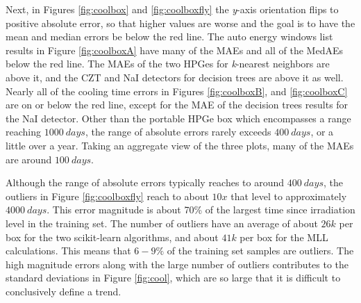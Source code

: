Next, in Figures \ref{fig:coolbox} and \ref{fig:coolboxfly} the \textit{y}-axis
orientation flips to positive absolute error, so that higher values are worse
and the goal is to have the mean and median errors be below the red line.  The
auto energy windows list results in Figure \ref{fig:coolboxA} have many of the
\gls{MAE}s and all of the \gls{MedAE}s below the red line.  The \gls{MAE}s of
the two \gls{HPGe}s for \textit{k}-nearest neighbors are above it, and the
\gls{CZT} and \gls{NaI} detectors for decision trees are above it as well.
Nearly all of the cooling time errors in Figures \ref{fig:coolboxB}, and
\ref{fig:coolboxC} are on or below the red line, except for the \gls{MAE} of
the decision trees results for the \gls{NaI} detector.  Other than the portable
\gls{HPGe} box which encompasses a range reaching $1000\:days$, the range of
absolute errors rarely exceeds $400\:days$, or a little over a year.  Taking an
aggregate view of the three plots, many of the \gls{MAE}s are around
$100\:days$.


Although the range of absolute errors typically reaches to around $400\:days$,
the outliers in Figure \ref{fig:coolboxfly} reach to about $10x$ that level to
approximately $4000\:days$. This error magnitude is about 70\% of the largest
time since irradiation level in the training set.  The number of outliers have
an average of about $26k$ per box for the two scikit-learn algorithms, and
about $41k$ per box for the \gls{MLL} calculations.  This means that $6-9\%$ of
the training set samples are outliers.  The high magnitude errors along with
the large number of outliers contributes to the standard deviations in Figure
\ref{fig:cool}, which are so large that it is difficult to conclusively define
a trend.

